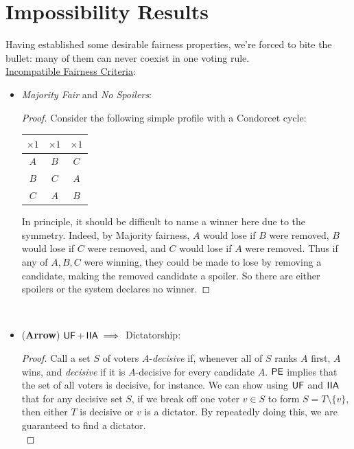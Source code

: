 \documentclass{amsart}
\DeclareMathOperator{\PE}{\sf{PE}}
\DeclareMathOperator{\UF}{\sf{UF}}
\DeclareMathOperator{\IIA}{\sf{IIA}}
\begin{document}
\newpage 

\section{Impossibility Results}

Having established some desirable fairness properties, we're forced to bite the bullet: many of them can never coexist in one voting rule. \\

\underline{Incompatible Fairness Criteria}:
\begin{itemize}
	\item \textit{Majority Fair} and \textit{No Spoilers}:
	\begin{proof}
		Consider the following simple profile with a Condorcet cycle:
		\begin{center}
		\begin{tabular}{|c|c|c|}
			\hline 
			$\times 1$ & $\times 1$ & $\times 1$ \\
			\hline 
			$A$ & $B$ & $C$\\
			$B$ & $C$ & $A$\\
			$C$ & $A$ & $B$\\
			\hline
		\end{tabular}
		\end{center}
		In principle, it should be difficult to name a winner here due to the symmetry. Indeed, by Majority fairness, $A$ would lose if $B$ were removed, $B$ would lose if $C$ were removed, and $C$ would lose if $A$ were removed. Thus if any of $A,B,C$ were winning, they could be made to lose by removing a candidate, making the removed candidate a spoiler. So there are either spoilers or the system declares no winner.
	\end{proof}\\
	
	\item (\textbf{Arrow}) $\UF+\IIA\implies$ Dictatorship:
	\begin{proof}
		Call a set $S$ of voters $A$-\textit{decisive} if, whenever all of $S$ ranks $A$ first, $A$ wins, and \textit{decisive} if it is $A$-decisive for every candidate $A$. $\PE$ implies that the set of all voters is decisive, for instance. We can show using $\UF$ and $\IIA$ that for any decisive set $S$, if we break off one voter $v\in S$ to form $S=T\setminus\{v\}$, then either $T$ is decisive or $v$ is a dictator. By repeatedly doing this, we are guaranteed to find a dictator.\\
		

\end{proof}
\end{itemize}
\end{document}
